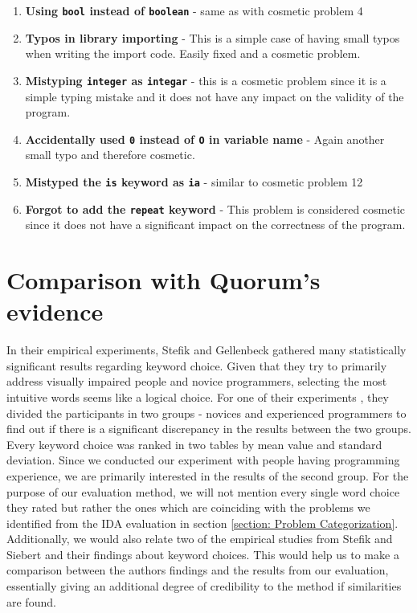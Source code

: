 \begin{enumerate}
\item \textbf{Using \lstinline!bool! instead of \lstinline!boolean!} - same as with cosmetic problem 4
\item \textbf{Typos in library importing} - This is a simple case of having small typos when writing the import code. Easily fixed and a cosmetic problem.
\item \textbf{Mistyping \lstinline!integer! as \lstinline!integar!}  - this is a cosmetic problem since it is a simple typing mistake and it does not have any impact on the validity of the program.
\item \textbf{ Accidentally used \lstinline!0! instead of \lstinline!O! in variable name}  - Again another small typo and therefore cosmetic.
\item \textbf{Mistyped the \lstinline!is! keyword as \lstinline!ia!}  - similar to cosmetic problem 12
\item \textbf{Forgot to add the \lstinline!repeat! keyword} - This problem is considered cosmetic since it does not have a significant impact on the correctness of the program.
\end{enumerate}

\section{Comparison with Quorum's evidence}
In their empirical experiments, Stefik and Gellenbeck \cite{EmpStudiesonStimuli} gathered many statistically significant results regarding keyword choice. Given that they try to primarily address visually impaired people and novice programmers, selecting the most intuitive words seems like a logical choice. For one of their  experiments \cite{EmpStudiesonStimuli}, they divided the participants in two groups - novices and experienced programmers to find out if there is a significant discrepancy in the results between the two groups. Every keyword choice was ranked in two tables by mean value and standard deviation. Since we conducted our experiment with people having programming experience, we are primarily interested in the results of the second group. For the purpose of our evaluation method, we will not mention every single word choice they rated but rather the ones which are coinciding with the problems we identified from the IDA evaluation in section \ref{section: Problem Categorization}. Additionally, we would also relate two of the empirical studies from Stefik and Siebert \cite{Empiricalinvestigation} and their findings about keyword choices. This would help us to make a comparison between the authors findings and the results from our evaluation, essentially giving an additional degree of credibility to the method if similarities are found.

